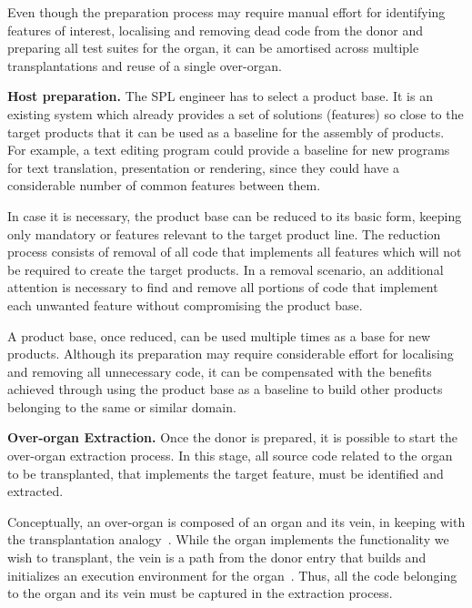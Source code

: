 Even though the preparation process may require manual effort for identifying features of interest,  localising and removing  dead code from the donor and preparing all test suites for the organ, it can be amortised across multiple transplantations and reuse of a single over-organ.

\textbf{Host preparation.} The SPL engineer has to select a product base. It is an existing system which already provides a set of solutions (features) so close to the target products that it can be used as a baseline for the assembly of products. For example, a text editing program could provide a baseline for new programs for text translation,  presentation or rendering, since they could have a considerable number of common features between them.

In case it is necessary, the product base can be reduced to its basic form, keeping only mandatory or features relevant to the target product line. The reduction process consists of removal of all code that implements all features which will not be required to create the target products. In a removal scenario, an additional attention is necessary to find and remove all portions of code that implement each unwanted feature without compromising the product base.

A product base, once reduced, can be used multiple times as a base for new products. Although its preparation may require considerable effort for localising and removing all unnecessary code, it can be compensated with the benefits achieved through using the product base as a baseline to build other products belonging to the same or similar domain.

\textbf{Over-organ Extraction.} Once the donor is prepared, it is possible to start the over-organ extraction process. In this stage,  all source code related to the organ to be transplanted, that implements the target feature, must be identified and extracted. 

Conceptually, an over-organ is composed of an organ and its vein, in keeping with the transplantation analogy~\cite{Barr2015}. While the organ implements the functionality we wish to transplant, the vein is a path from the donor entry that builds and initializes an execution environment for the organ~\cite{Barr2015}. Thus, all the code belonging to the organ and its vein must be captured in the extraction process.

